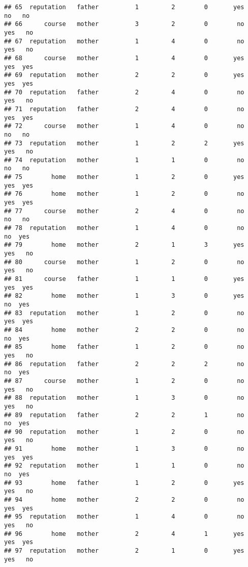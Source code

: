 \documentclass[
]{article}
\begin{document}
\begin{verbatim}
## 65  reputation   father          1         2        0       yes     no   no
## 66      course   mother          3         2        0        no    yes   no
## 67  reputation   mother          1         4        0        no    yes   no
## 68      course   mother          1         4        0       yes    yes  yes
## 69  reputation   mother          2         2        0       yes    yes  yes
## 70  reputation   father          2         4        0        no    yes   no
## 71  reputation   father          2         4        0        no    yes  yes
## 72      course   mother          1         4        0        no     no   no
## 73  reputation   mother          1         2        2       yes    yes   no
## 74  reputation   mother          1         1        0        no     no   no
## 75        home   mother          1         2        0       yes    yes  yes
## 76        home   mother          1         2        0        no    yes  yes
## 77      course   mother          2         4        0        no     no   no
## 78  reputation   mother          1         4        0        no     no  yes
## 79        home   mother          2         1        3       yes    yes   no
## 80      course   mother          1         2        0        no    yes   no
## 81      course   father          1         1        0       yes    yes  yes
## 82        home   mother          1         3        0       yes     no  yes
## 83  reputation   mother          1         2        0        no    yes  yes
## 84        home   mother          2         2        0        no     no  yes
## 85        home   father          1         2        0        no    yes   no
## 86  reputation   father          2         2        2        no     no  yes
## 87      course   mother          1         2        0        no    yes   no
## 88  reputation   mother          1         3        0        no    yes   no
## 89  reputation   father          2         2        1        no     no  yes
## 90  reputation   mother          1         2        0        no    yes   no
## 91        home   mother          1         3        0        no    yes  yes
## 92  reputation   mother          1         1        0        no     no  yes
## 93        home   father          1         2        0       yes    yes   no
## 94        home   mother          2         2        0        no    yes  yes
## 95  reputation   mother          1         4        0        no    yes   no
## 96        home   mother          2         4        1       yes    yes  yes
## 97  reputation   mother          2         1        0       yes    yes   no

\end{verbatim}
\end{document}
